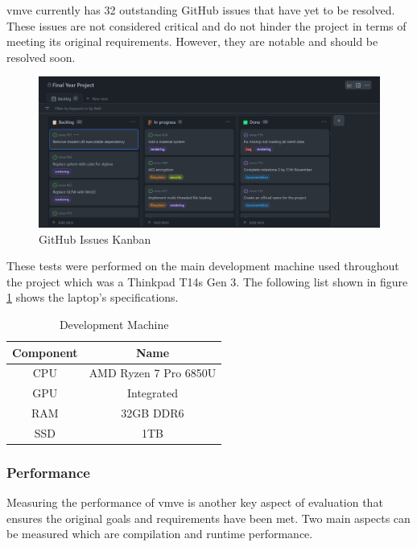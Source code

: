 \documentclass[11pt]{article}
\begin{document}
\gls*{vmve} currently has 32 outstanding GitHub issues that have yet to be
resolved. These issues are not considered critical and do not hinder the project
in terms of meeting its original requirements. However, they are notable and
should be resolved soon.
\begin{figure}[H]
  \centering
  \includegraphics[width=\textwidth]{images/github_project.png}
  \caption{GitHub Issues Kanban}
  \label{fig:github_kanban}
\end{figure}

These tests were performed on the main development machine used throughout the
project which was a Thinkpad T14s Gen 3. The following list shown in figure
\ref{fig:development_machine} shows the laptop's specifications.

\begin{table}[H]
\centering
\begin{tabular}{|| c c ||} 
  \hline
  Component & Name \\ [0.5ex] 
  \hline\hline
  CPU & AMD Ryzen 7 Pro 6850U  \\ 
  GPU & Integrated \\
  RAM & 32GB DDR6 \\ 
  SSD & 1TB \\
  \hline
\end{tabular}
\caption{Development Machine}
\label{fig:development_machine}
\end{table}


\subsubsection{Performance}
Measuring the performance of \gls*{vmve} is another key aspect of evaluation that
ensures the original goals and requirements have been met. Two main aspects can
be measured which are compilation and runtime performance.
\end{document}

